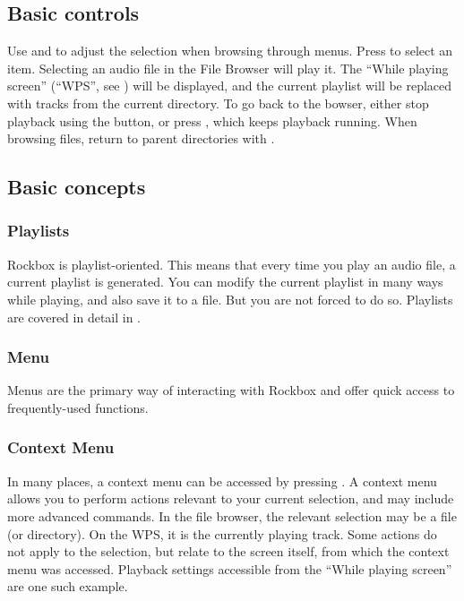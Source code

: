 \subsection{Basic controls}
Use \ActionStdNext{} and \ActionStdPrev{} to adjust the selection when browsing
through menus. 
Press \ActionStdOk{} to select an item. Selecting an audio file in the File Browser
will play it. The ``While playing screen'' (``WPS'', see ) will
be displayed, and the current playlist will be replaced with tracks from the current
directory. To go back to the bowser, either stop playback using the
\ActionWpsStop{} button, or press \ActionWpsBrowse{}, which keeps playback
running.
When browsing files, return to parent directories with \ActionTreeParentDirectory.

\subsection{Basic concepts}
\subsubsection{Playlists}
Rockbox is playlist-oriented. This means that every time you play an audio file,
a current playlist is generated.
You can modify the current playlist in many ways while playing, and also save
it to a file. But you are not forced to do so.
Playlists are covered in detail in .

\subsubsection{Menu}
Menus are the primary way of interacting with Rockbox and offer quick access
to frequently-used functions.

\subsubsection{Context Menu}
In many places, a context menu can be accessed by pressing \ActionStdContext{}.
A context menu allows you to perform actions relevant to your current selection, and may
include more advanced commands.
In the file browser, the relevant selection may be a file (or directory).
On the WPS, it is the currently playing track. Some actions do not apply
to the selection, but relate to the screen itself, from which the context menu
was accessed. Playback settings accessible from the “While playing screen” are one such
example.

